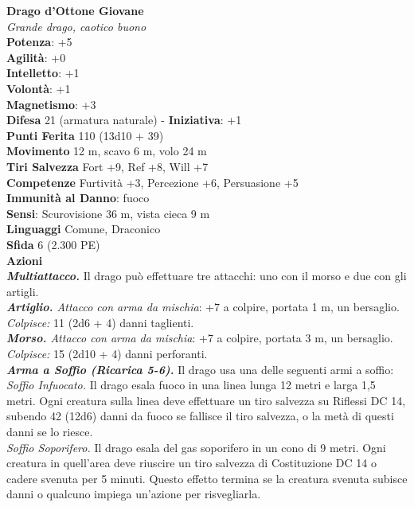 \begin{multicols}{2}
\medskip\textbf{Drago d'Ottone Giovane}\\
\emph{Grande drago, caotico buono}\\
\textbf{Potenza}: +5\\
\textbf{Agilità}: +0\\
\textbf{Intelletto}: +1\\
\textbf{Volontà}: +1\\
\textbf{Magnetismo}: +3\\
\textbf{Difesa} 21 (armatura naturale) - \textbf{Iniziativa}: +1\\
\textbf{Punti Ferita} 110 (13d10 + 39)\\
\textbf{Movimento} 12 m, scavo 6 m, volo 24 m\\
\textbf{Tiri Salvezza} Fort +9, Ref +8, Will +7\\
\textbf{Competenze} Furtività +3, Percezione +6, Persuasione +5\\
\textbf{Immunità al Danno}: fuoco\\
\textbf{Sensi}: Scurovisione 36 m, vista cieca 9 m\\
\textbf{Linguaggi} Comune, Draconico\\
\textbf{Sfida} 6 (2.300 PE)\smallskip\\
\smallskip\textbf{Azioni}\\
\emph{\textbf{Multiattacco.}} Il drago può effettuare tre attacchi: uno con il morso e due con gli artigli.\\
\emph{\textbf{Artiglio.} Attacco con arma da mischia}: +7 a colpire, portata 1 m, un bersaglio.\\
\emph{Colpisce:} 11 (2d6 + 4) danni taglienti.\\
\emph{\textbf{Morso.} Attacco con arma da mischia}: +7 a colpire, portata 3 m, un bersaglio.\\
\emph{Colpisce:} 15 (2d10 + 4) danni perforanti.\\
\emph{\textbf{Arma a Soffio (Ricarica 5-6).}} Il drago usa una delle seguenti armi a soffio:\\
\emph{Soffio Infuocato.} Il drago esala fuoco in una linea lunga 12 metri e larga 1,5 metri. Ogni creatura sulla linea deve effettuare un tiro salvezza su Riflessi DC 14, subendo 42 (12d6) danni da fuoco se fallisce il tiro salvezza, o la metà di questi danni se lo riesce.\\
\emph{Soffio Soporifero.} Il drago esala del gas soporifero in un cono di 9 metri. Ogni creatura in quell'area deve riuscire un tiro salvezza di Costituzione DC 14 o cadere svenuta per 5 minuti. Questo effetto termina se la creatura svenuta subisce danni o qualcuno impiega un'azione per risvegliarla.\\

\end{multicols}
